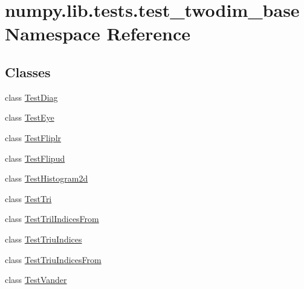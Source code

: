 \hypertarget{namespacenumpy_1_1lib_1_1tests_1_1test__twodim__base}{}\section{numpy.\+lib.\+tests.\+test\+\_\+twodim\+\_\+base Namespace Reference}
\label{namespacenumpy_1_1lib_1_1tests_1_1test__twodim__base}
\subsection*{Classes}
\begin{DoxyCompactItemize}
\item 
class \hyperlink{classnumpy_1_1lib_1_1tests_1_1test__twodim__base_1_1TestDiag}{Test\+Diag}
\item 
class \hyperlink{classnumpy_1_1lib_1_1tests_1_1test__twodim__base_1_1TestEye}{Test\+Eye}
\item 
class \hyperlink{classnumpy_1_1lib_1_1tests_1_1test__twodim__base_1_1TestFliplr}{Test\+Fliplr}
\item 
class \hyperlink{classnumpy_1_1lib_1_1tests_1_1test__twodim__base_1_1TestFlipud}{Test\+Flipud}
\item 
class \hyperlink{classnumpy_1_1lib_1_1tests_1_1test__twodim__base_1_1TestHistogram2d}{Test\+Histogram2d}
\item 
class \hyperlink{classnumpy_1_1lib_1_1tests_1_1test__twodim__base_1_1TestTri}{Test\+Tri}
\item 
class \hyperlink{classnumpy_1_1lib_1_1tests_1_1test__twodim__base_1_1TestTrilIndicesFrom}{Test\+Tril\+Indices\+From}
\item 
class \hyperlink{classnumpy_1_1lib_1_1tests_1_1test__twodim__base_1_1TestTriuIndices}{Test\+Triu\+Indices}
\item 
class \hyperlink{classnumpy_1_1lib_1_1tests_1_1test__twodim__base_1_1TestTriuIndicesFrom}{Test\+Triu\+Indices\+From}
\item 
class \hyperlink{classnumpy_1_1lib_1_1tests_1_1test__twodim__base_1_1TestVander}{Test\+Vander}
\end{DoxyCompactItemize}
